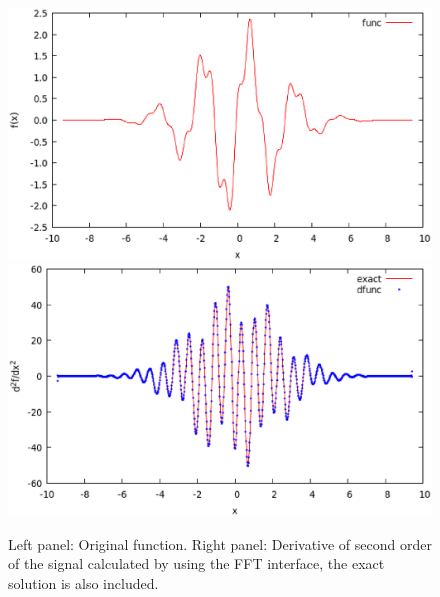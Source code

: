 \begin{figure}[ht]
\centering
\includegraphics[scale=0.36]{images/FFT-func2.eps}
\includegraphics[scale=0.36]{images/FFT-dfunc.eps}
\caption{\footnotesize{
Left panel: Original function. Right panel: Derivative of second order of the signal calculated by using
the FFT interface, the exact solution is also included.
}}
\end{figure}
